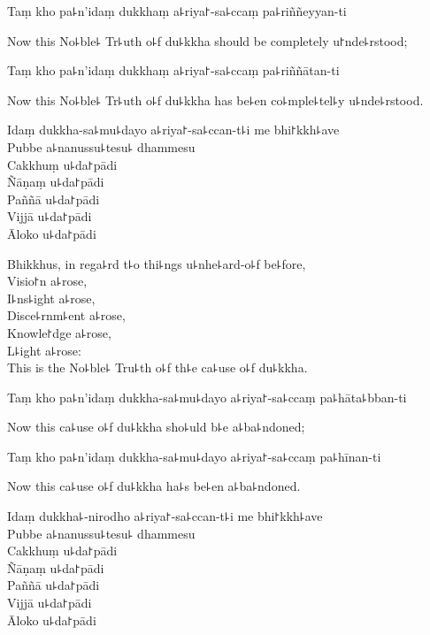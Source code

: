 Taṃ kho pa꜕n'idaṃ dukkhaṃ a꜕riya꜓-sa꜕ccaṃ pa꜕riññeyyan-ti

\begin{english}
  Now this No꜕ble꜕ Tr꜕uth o꜕f du꜕kkha should be completely u꜓nde꜕rstood;
\end{english}

Taṃ kho pa꜕n'idaṃ dukkhaṃ a꜕riya꜓-sa꜕ccaṃ pa꜕riññātan-ti

\begin{english}
  Now this No꜕ble꜕ Tr꜕uth o꜕f du꜕kkha has be꜕en co꜕mple꜕tel꜕y u꜕nde꜕rstood.
\end{english}

Idaṃ dukkha-sa꜕mu꜕dayo a꜕riya꜓-sa꜕ccan-t꜕i me bhi꜓kkh꜕ave\\
Pubbe a꜕nanussu꜕tesu꜕ dhammesu\\
Cakkhuṃ u꜕da꜓pādi\\
Ñāṇaṃ u꜕da꜓pādi\\
Paññā u꜕da꜓pādi\\
Vijjā u꜕da꜓pādi\\
Āloko u꜕da꜓pādi

\begin{english}
  Bhikkhus, in rega꜕rd t꜕o thi꜕ngs u꜕nhe꜕ard-o꜕f be꜕fore,\\
  Visio꜓n a꜕rose,\\
  I꜕ns꜕ight a꜕rose,\\
  Disce꜕rnm꜕ent a꜕rose,\\
  Knowle꜓dge a꜕rose,\\
  L꜕ight a꜕rose:\\
  This is the No꜕ble꜕ Tru꜕th o꜕f th꜕e ca꜕use o꜕f du꜕kkha.
\end{english}

Taṃ kho pa꜕n'idaṃ dukkha-sa꜕mu꜕dayo a꜕riya꜓-sa꜕ccaṃ pa꜕hāta꜕bban-ti

\begin{english}
  Now this ca꜕use o꜕f du꜕kkha sho꜕uld b꜕e a꜕ba꜕ndoned;
\end{english}

Taṃ kho pa꜕n'idaṃ dukkha-sa꜕mu꜕dayo a꜕riya꜓-sa꜕ccaṃ pa꜕hīnan-ti

\begin{english}
  Now this ca꜕use o꜕f du꜕kkha ha꜕s be꜕en a꜕ba꜕ndoned.
\end{english}

Idaṃ dukkha꜕-nirodho a꜕riya꜓-sa꜕ccan-t꜕i me bhi꜓kkh꜕ave\\
Pubbe a꜕nanussu꜕tesu꜕ dhammesu\\
Cakkhuṃ u꜕da꜓pādi\\
Ñāṇaṃ u꜕da꜓pādi\\
Paññā u꜕da꜓pādi\\
Vijjā u꜕da꜓pādi\\
Āloko u꜕da꜓pādi

